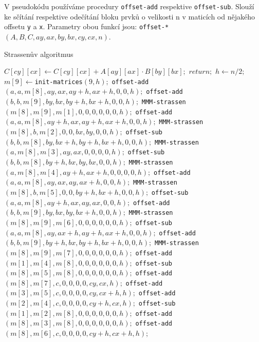 V pseudokódu používáme procedury \texttt{offset-add} respektive \texttt{offset-sub}. Slouží ke sčítání respektive odečítání bloku prvků o velikosti n v maticích od nějakého offsetu \texttt{y} a \texttt{x}. Parametry obou funkcí jsou: \texttt{offset-*}$(A,B,C,ay,ax,by,bx,cy,cx,n)$. 

\begin{algorithm}[H]
	\caption{Strassenův algoritmus}\label{mmm-strassen}
	\begin{algorithmic}[1]
			\State \texttt{$C[cy][cx]\gets C[cy][cx] + A[ay][ax] \cdot B[by][bx];$}
			\State \texttt{$return;$}
		\EndIf
  		\State \texttt{$h \gets n/2;$} 
  		\State \texttt{$m[9] \gets $init-matrices$(9, h);$} 
	\State \texttt{offset-add$(a, a, m[8], ay, ax, ay + h, ax + h, 0, 0, h);$} 
	\State \texttt{offset-add$(b, b, m[9], by, bx, by + h, bx + h, 0, 0, h);$}
	\State \texttt{MMM-strassen$(m[8], m[9], m[1], 0, 0, 0, 0, 0, 0, h);$}
%	
	\State \texttt{offset-add$(a, a, m[8], ay + h, ax, ay + h, ax + h, 0, 0, h);$} 
	\State \texttt{MMM-strassen$(m[8], b, m[2], 0, 0, bx, by, 0, 0, h);$}
%	
	\State \texttt{offset-sub$(b, b, m[8], by, bx + h, by + h, bx + h, 0, 0, h);$} 
	\State \texttt{MMM-strassen$(a, m[8], m[3], ay, ax, 0, 0, 0, 0, h);$}
%	
	\State \texttt{offset-sub$(b, b, m[8], by + h, bx, by, bx, 0, 0, h);$} 
	\State \texttt{MMM-strassen$(a, m[8], m[4], ay + h, ax + h, 0, 0, 0, 0, h);$}
%	
	\State \texttt{offset-add$(a, a, m[8], ay, ax, ay, ax + h, 0, 0, h);$} 
	\State \texttt{MMM-strassen$(m[8], b, m[5], 0, 0, by + h, bx + h, 0, 0, h);$}
%	
	\State \texttt{offset-sub$(a, a, m[8], ay + h, ax, ay, ax, 0, 0, h);$} 
	\State \texttt{offset-add$(b, b, m[9], by, bx, by, bx + h, 0, 0, h);$}
	\State \texttt{MMM-strassen$(m[8], m[9], m[6], 0, 0, 0, 0, 0, 0, h);$}
%	
	\State \texttt{offset-sub$(a, a, m[8], ay, ax + h, ay + h, ax + h, 0, 0, h);$} 
	\State \texttt{offset-add$(b, b, m[9], by + h, bx, by + h, bx + h, 0, 0, h);$}
	\State \texttt{MMM-strassen$(m[8], m[9], m[7], 0, 0, 0, 0, 0, 0, h);$}
%	
	\State \texttt{offset-add$(m[1], m[4], m[8], 0, 0, 0, 0, 0, 0, h);$} 
	\State \texttt{offset-sub$(m[8], m[5], m[8], 0, 0, 0, 0, 0, 0, h);$}
	\State \texttt{offset-add$(m[8], m[7], c, 0, 0, 0, 0, cy, cx, h);$}
%	
	\State \texttt{offset-add$(m[3], m[5], c, 0, 0, 0, 0, cy, cx + h, h);$} 
%	
	\State \texttt{offset-add$(m[2], m[4], c, 0, 0, 0, 0, cy + h, cx, h);$} 
%	
	\State \texttt{offset-sub$(m[1], m[2], m[8], 0, 0, 0, 0, 0, 0, h);$} 
	\State \texttt{offset-add$(m[8], m[3], m[8], 0, 0, 0, 0, 0, 0, h);$}
	\State \texttt{offset-add$(m[8], m[6], c, 0, 0, 0, 0, cy + h, cx + h, h);$}		
		\EndProcedure
	\end{algorithmic}
\end{algorithm}

